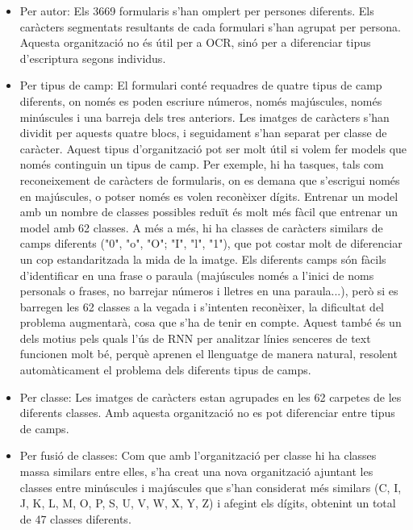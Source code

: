 \documentclass[12pt, spanish]{article}
\begin{document}
\begin{itemize}
\item Per autor: Els 3669 formularis s'han omplert per persones diferents. Els caràcters segmentats resultants de cada formulari s'han agrupat per persona. Aquesta organització no és útil per a OCR, sinó per a diferenciar tipus d'escriptura segons individus.

\item Per tipus de camp: El formulari conté requadres de quatre tipus de camp diferents, on només es poden escriure números, només majúscules, només minúscules i una barreja dels tres anteriors. Les imatges de caràcters s'han dividit per aquests quatre blocs, i seguidament s'han separat per classe de caràcter. Aquest tipus d'organització pot ser molt útil si volem fer models que només continguin un tipus de camp. Per exemple, hi ha tasques, tals com reconeixement de caràcters de formularis, on es demana que s'escrigui només en majúscules, o potser només es volen reconèixer dígits. Entrenar un model amb un nombre de classes possibles reduït és molt més fàcil que entrenar un model amb 62 classes. A més a més, hi ha classes de caràcters similars de camps diferents ("0", "o", "O"; "I", "l", "1"), que pot costar molt de diferenciar un cop estandaritzada la mida de la imatge. Els diferents camps són fàcils d'identificar en una frase o paraula (majúscules només a l'inici de noms personals o frases, no barrejar números i lletres en una paraula...), però si es barregen les 62 classes a la vegada i s'intenten reconèixer, la dificultat del problema augmentarà, cosa que s'ha de tenir en compte. Aquest també és un dels motius pels quals l'ús de RNN per analitzar línies senceres de text funcionen molt bé, perquè aprenen el llenguatge de manera natural, resolent automàticament el problema dels diferents tipus de camps. 

\item Per classe: Les imatges de caràcters estan agrupades en les 62 carpetes de les diferents classes. Amb aquesta organització no es pot diferenciar entre tipus de camps. 

\item Per fusió de classes: Com que amb l'organització per classe hi ha classes massa similars entre elles, s'ha creat una nova organització ajuntant les classes entre minúscules i majúscules  que s'han considerat més similars (C, I, J, K, L, M, O, P, S, U, V, W, X, Y, Z) i afegint els dígits, obtenint un total de 47 classes diferents.
\end{itemize}
\end{document}
